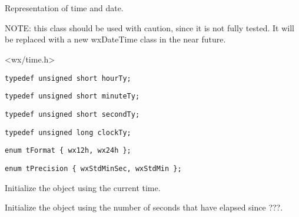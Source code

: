 \section{}\label{wxtime}

Representation of time and date.

NOTE: this class should be
used with caution, since it is not fully tested. It will be replaced
with a new wxDateTime class in the near future.




<wx/time.h>


{\small \begin{verbatim}
typedef unsigned short hourTy;
\end{verbatim}}

{\small \begin{verbatim}
typedef unsigned short minuteTy;
\end{verbatim}}

{\small \begin{verbatim}
typedef unsigned short secondTy;
\end{verbatim}}

{\small \begin{verbatim}
typedef unsigned long clockTy;
\end{verbatim}}

{\small \begin{verbatim}
enum tFormat { wx12h, wx24h };
\end{verbatim}}

{\small \begin{verbatim}
enum tPrecision { wxStdMinSec, wxStdMin };
\end{verbatim}}




\label{wxtimewxtime}


Initialize the object using the current time.


Initialize the object using the number of seconds that have elapsed since ???.

